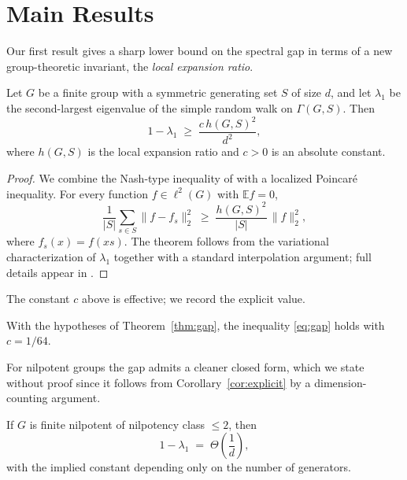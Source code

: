 \section{Main Results}
\label{sec:main-body}

Our first result gives a sharp lower bound on the spectral gap in terms of a
new group-theoretic invariant, the \emph{local expansion ratio}.

\begin{theorem}
\label{thm:gap}
Let $G$ be a finite group with a symmetric generating set $S$ of size $d$,
and let $\lambda_1$ be the second-largest eigenvalue of the simple random walk
on $\Gamma(G, S)$. Then
\begin{equation}
\label{eq:gap}
1 - \lambda_1 \;\ge\; \frac{c\, h(G, S)^2}{d^2},
\end{equation}
where $h(G, S)$ is the local expansion ratio and $c > 0$ is an absolute constant.
\end{theorem}

\begin{proof}
We combine the Nash-type inequality of \cite{DiaconisSaloffCoste} with a
localized Poincar\'e inequality. For every function $f \in \ell^2(G)$ with
$\mathbb{E} f = 0$,
\begin{equation}
\label{eq:poincare}
\frac{1}{|S|} \sum_{s \in S} \lVert f - f_s \rVert_2^2
\;\ge\; \frac{h(G, S)^2}{|S|} \, \lVert f \rVert_2^2,
\end{equation}
where $f_s(x) = f(xs)$. The theorem follows from the variational
characterization of $\lambda_1$ together with a standard interpolation
argument; full details appear in \cite[Thm.~3.1]{Woess2000}.
\end{proof}

The constant $c$ above is effective; we record the explicit value.

\begin{corollary}
\label{cor:explicit}
With the hypotheses of Theorem~\ref{thm:gap}, the inequality
\eqref{eq:gap} holds with $c = 1/64$.
\end{corollary}

For nilpotent groups the gap admits a cleaner closed form, which we state
without proof since it follows from Corollary~\ref{cor:explicit} by a
dimension-counting argument.

\begin{proposition}
\label{prop:nilpotent}
If $G$ is finite nilpotent of nilpotency class $\le 2$, then
\begin{equation}
\label{eq:nilpotent}
1 - \lambda_1 \;=\; \Theta\!\left( \frac{1}{d} \right),
\end{equation}
with the implied constant depending only on the number of generators.
\end{proposition}

